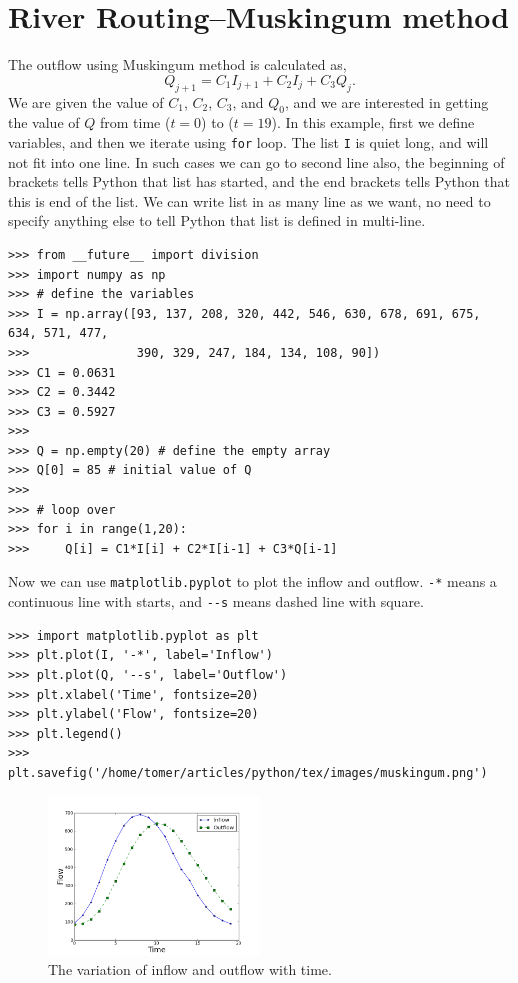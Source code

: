 \documentclass[10pt]{book}
\begin{document}
{\section{River Routing--Muskingum method}
The outflow using Muskingum method is calculated as,
\begin{equation}
Q_{j+1} = C_1 I_{j+1} + C_2 I_j + C_3 Q_j.
\end{equation}
We are given the value of $C_1$, $C_2$, $C_3$, and $Q_0$, and we are interested in getting the value of $Q$ from time ($t=0$) to ($t=19$). In this example, first we define variables, and then we iterate using \verb"for" loop. The list \verb"I" is quiet long, and will not fit into one line. In such cases we can go to second line also, the beginning of brackets tells Python that list has started, and the end brackets tells Python that this is end of the list. We can write list in as many line as we want, no need to specify anything else to tell Python that list is defined in multi-line. 
\beforeverb \begin{verbatim}
>>> from __future__ import division
>>> import numpy as np
>>> # define the variables
>>> I = np.array([93, 137, 208, 320, 442, 546, 630, 678, 691, 675, 634, 571, 477, 
>>>               390, 329, 247, 184, 134, 108, 90])
>>> C1 = 0.0631
>>> C2 = 0.3442
>>> C3 = 0.5927
>>> 
>>> Q = np.empty(20) # define the empty array
>>> Q[0] = 85 # initial value of Q
>>> 
>>> # loop over
>>> for i in range(1,20):
>>>     Q[i] = C1*I[i] + C2*I[i-1] + C3*Q[i-1] 
\end{verbatim} \afterverb

Now we can use \verb"matplotlib.pyplot" to plot the inflow and outflow. \verb"-*" means a continuous line with starts, and \verb"--s" means dashed line with square. 
\beforeverb \begin{verbatim}
>>> import matplotlib.pyplot as plt
>>> plt.plot(I, '-*', label='Inflow')
>>> plt.plot(Q, '--s', label='Outflow')
>>> plt.xlabel('Time', fontsize=20)
>>> plt.ylabel('Flow', fontsize=20)
>>> plt.legend()
>>> plt.savefig('/home/tomer/articles/python/tex/images/muskingum.png')
\end{verbatim} \afterverb

\beforefig
\begin{figure}[h!]
  \centering
    \includegraphics[width=0.5\textwidth]{images/muskingum.png}
  \caption{The variation of inflow and outflow with time.}
   \label{fig:musk}
\end{figure}
\afterfig

}
\end{document}
